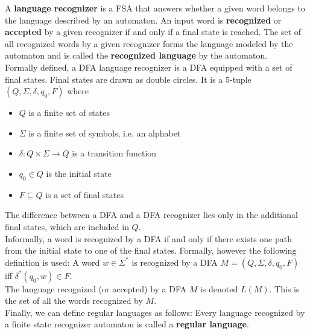 A \textbf{language recognizer} is a FSA that answers whether
a given word belongs to the language described by an automaton.
An input word is \textbf{recognized} or \textbf{accepted} by a given recognizer 
if and only if a final state is reached.
The set of all recognized words by a given recognizer forms the language modeled by the automaton 
and is called the \textbf{recognized language} by the automaton.\\

Formally defined, a DFA language recognizer is a DFA equipped with a set of final states.
Final states are drawn as double circles.
It is a 5-tuple $(Q, \Sigma, \delta, q_0, F)$ where
\begin{itemize}
  \item $Q$ is a finite set of states
  \item $\Sigma$ is a finite set of symbols, i.e. an alphabet
  \item $\delta : Q \times \Sigma \rightarrow Q$ is a transition function
  \item $q_0 \in Q$ is the initial state
  \item $F \subseteq Q$ is a set of final states
\end{itemize}
The difference between a DFA and a DFA recognizer lies only in the 
additional final states, which are included in $Q$.\\

Informally, a word is recognized by a DFA if and only if there 
exists one path from the initial state to one of the final states.
Formally, however the following definition is used:
A word $w \in \Sigma^{*}$ is recognized by a DFA $M = (Q, \Sigma, \delta, q_0, F)$
iff $\delta^{*}(q_0, w) \in F$.\\

The language recognized (or accepted) by a DFA $M$ is denoted $L(M)$. This is the set of all the words recognized by $M$.\\

Finally, we can define regular languages as follows:
Every language recognized by a finite state recognizer automaton is called a \textbf{regular language}.\\

